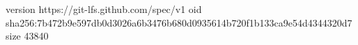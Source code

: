 version https://git-lfs.github.com/spec/v1
oid sha256:7b472b9e597db0d3026a6b3476b680d0935614b720f1b133ca9e54d4344320d7
size 43840
